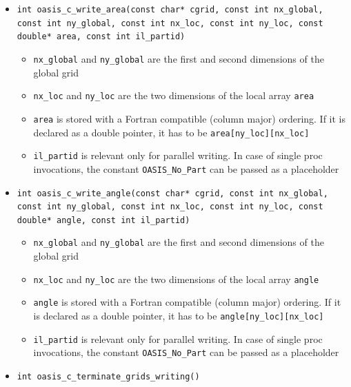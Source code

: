 \begin{itemize}
\vspace{0.2cm}
\item {\tt int oasis\_c\_write\_area(const char* cgrid, const int nx\_global, const int ny\_global, const int nx\_loc, const int ny\_loc, const double* area, const int il\_partid)}
  \begin{itemize}
    \item {\tt nx\_global} and {\tt ny\_global} are the first and second dimensions
      of the global grid
    \item {\tt nx\_loc} and {\tt ny\_loc} are the two dimensions
      of the local array {\tt area}
    \item {\tt area} is stored with a Fortran compatible
      (column major) ordering. If it is  declared as a double
      pointer, it has to be {\tt area[ny\_loc][nx\_loc]}
    \item {\tt il\_partid} is relevant only for parallel writing. In case
      of single proc invocations, the constant {\tt OASIS\_No\_Part}
      can be passed as a placeholder
  \end{itemize}

\vspace{0.2cm}
\item {\tt int oasis\_c\_write\_angle(const char* cgrid, const int nx\_global, const int ny\_global, const int nx\_loc, const int ny\_loc, const double* angle, const int il\_partid)}
  \begin{itemize}
    \item {\tt nx\_global} and {\tt ny\_global} are the first and second dimensions
      of the global grid
    \item {\tt nx\_loc} and {\tt ny\_loc} are the two dimensions
      of the local array {\tt angle}
    \item {\tt angle} is stored with a Fortran compatible
      (column major) ordering. If it is  declared as a double
      pointer, it has to be {\tt angle[ny\_loc][nx\_loc]}
    \item {\tt il\_partid} is relevant only for parallel writing. In case
      of single proc invocations, the constant {\tt OASIS\_No\_Part}
      can be passed as a placeholder
  \end{itemize}

\vspace{0.2cm}
\item {\tt int oasis\_c\_terminate\_grids\_writing()}


\end{itemize}
